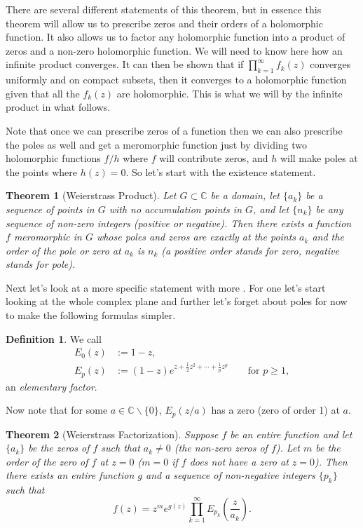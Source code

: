 \documentclass[12pt]{article}
\theoremstyle{theorem}
\newtheorem*{thm}{Theorem}
\theoremstyle{definition}
\newtheorem*{defn}{Definition}
\theoremstyle{remark}
\begin{document}
There are several different statements of this theorem, but in essence this theorem will allow us to prescribe zeros and their orders of a holomorphic function.  It also allows us to factor any holomorphic function into
a product of zeros and a non-zero holomorphic function.  We will need to know
here how an infinite product converges.  It can then be shown
that if $\prod_{k=1}^\infty f_k(z)$ converges uniformly and 
on compact subsets, then it converges to a holomorphic function given that all the $f_k(z)$ are holomorphic.  This is what we will  by the infinite product in what follows.

Note that once we can prescribe zeros of a function then we can also prescribe the poles as well and get a meromorphic function just by dividing
two holomorphic functions $f/h$ where $f$ will contribute zeros, and
$h$ will make poles at the points where $h(z) = 0$.  So let's start with the existence statement.

\begin{thm}[Weierstrass Product]
Let $G \subset {\mathbb{C}}$ be a domain, let $\{a_k\}$ be a sequence of
points in $G$ with no accumulation points in $G$, and let $\{n_k\}$ be any
sequence of non-zero integers (positive or negative).
Then there exists a function
$f$ meromorphic in $G$ whose poles and zeros are exactly at the points $a_k$
and the order of the pole or zero at $a_k$ is $n_k$
(a positive order stands for zero, negative stands for pole).
\end{thm}

Next let's look at a more specific statement with more .  For
one let's start looking at the whole complex plane and further let's forget about poles for now to make the following formulas simpler.

\begin{defn}
We call
\begin{align*}
E_0(z) & := 1-z,
\\
E_p(z) & := (1-z) e^{z+\frac{1}{2}z^2 + \cdots + \frac{1}{p} z^p} \qquad \text{for $p \geq 1$},
\end{align*}
an {\em elementary factor}.
\end{defn}

Now note that for some $a \in {\mathbb{C}} \backslash \{ 0 \}$, $E_p(z/a)$ has a  zero (zero of order 1) at $a$.

\begin{thm}[Weierstrass Factorization]
Suppose $f$ be an entire function and let $\{ a_k \}$ be the zeros of $f$
such that $a_k \not= 0$ (the non-zero zeros of $f$).  Let $m$ be the order of
the zero of $f$ at $z=0$ ($m=0$ if $f$ does not have a zero at $z=0$).  Then
there exists an entire function $g$ and a sequence of non-negative
integers $\{ p_k \}$ such that
\begin{equation*}
f(z) = z^m e^{g(z)} \prod_{k=1}^\infty E_{p_k} \left( \frac{z}{a_k} \right) .
\end{equation*}
\end{thm}
\end{document}
